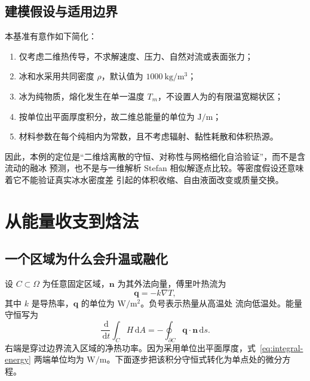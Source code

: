 \documentclass[UTF8,11pt]{ctexart}
\numberwithin{equation}{section}
\newcommand{\dd}{\,\mathrm d}
\begin{document}
\subsection{建模假设与适用边界}

本基准有意作如下简化：
\begin{enumerate}
      \item 仅考虑二维热传导，不求解速度、压力、自然对流或表面张力；
      \item 冰和水采用共同密度 $\rho$，默认值为 $\SI{1000}{\kilogram\per\metre\cubed}$；
      \item 冰为纯物质，熔化发生在单一温度 $T_m$，不设置人为的有限温宽糊状区；
      \item 按单位出平面厚度积分，故二维总能量的单位为
            $\si{\joule\per\metre}$；
      \item 材料参数在每个纯相内为常数，且不考虑辐射、黏性耗散和体积热源。
\end{enumerate}
因此，本例的定位是“二维焓离散的守恒、对称性与网格细化自洽验证”，而不是含流动的融冰
预测，也不是与一维解析 Stefan 相似解逐点比较。等密度假设还意味着它不能验证真实冰水密度差
引起的体积收缩、自由液面改变或质量交换。

\section{从能量收支到焓法}

\subsection{一个区域为什么会升温或融化}

设 $C\subset\Omega$ 为任意固定区域，$\bm n$ 为其外法向量，傅里叶热流为
\begin{equation}
      \bm q=-k\nabla T,
      \label{eq:fourier-law}
\end{equation}
其中 $k$ 是导热率，$\bm q$ 的单位为 $\si{\watt\per\metre\squared}$。负号表示热量从高温处
流向低温处。能量守恒写为
\begin{equation}
      \frac{\dd}{\dd t}\int_C H\dd A
      =-\oint_{\partial C}\bm q\cdot\bm n\dd s.
      \label{eq:integral-energy}
\end{equation}
右端是穿过边界流入区域的净热功率。因为采用单位出平面厚度，式~\eqref{eq:integral-energy}
两端单位均为 $\si{\watt\per\metre}$。下面逐步把该积分守恒式转化为单点处的微分方程。
\end{document}
